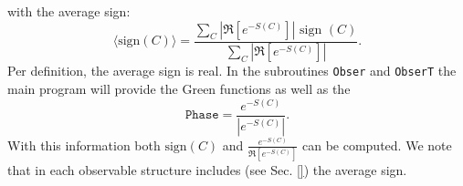 with the average sign:
\begin{equation}
	 \langle \text{sign} (C) \rangle =    \frac { \sum_{C}  \left|  \Re \left[ e^{-S(C)} \right]   \right|   \text{ sign }(C) }  {  \sum_{C}   \left| \Re \left[ e^{-S(C)} \right] \right|  }.  
\end{equation}
Per definition, the average sign is real.     In the subroutines  \texttt{Obser}  and \texttt{ObserT}  the main program will provide  the Green functions as well as the 
\begin{equation}
	\texttt{Phase}   =   \frac{e^{-S(C)}}{ \left| e^{-S(C) }\right| }.
\end{equation}
With this information  both $ \text{sign} (C) $ and $  \frac{e^{-S(C)}} {\Re \left[e^{-S(C)} \right]}   $ can be computed. We note that in each observable structure  includes  (see Sec. \ref{})    the average sign. 
 
